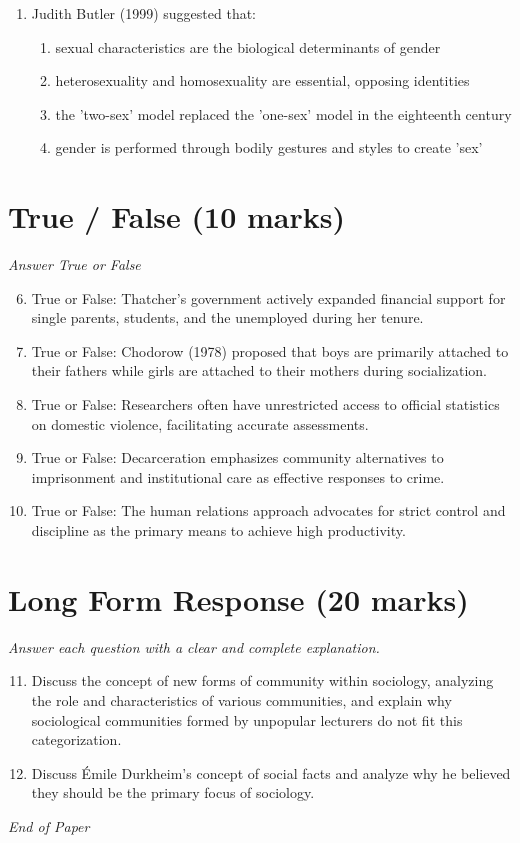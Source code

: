 \documentclass[12pt]{article}
\begin{document}
\begin{enumerate}[label=\arabic*.]
\begin{enumerate}[label=(\alph*)]
    \item a universalist system of welfare for all, regardless of income
    \item decommodifying social welfare through state provision
\end{enumerate}
\item Judith Butler (1999) suggested that:
\begin{enumerate}[label=(\alph*)]
    \item sexual characteristics are the biological determinants of gender
    \item heterosexuality and homosexuality are essential, opposing identities
    \item the 'two-sex' model replaced the 'one-sex' model in the eighteenth century
    \item gender is performed through bodily gestures and styles to create 'sex'
\end{enumerate}
\end{enumerate}

\section*{True / False (10 marks)}
\textit{Answer True or False}
\begin{enumerate}[label=\arabic*.]
\setcounter{enumi}{5}
\item True or False: Thatcher's government actively expanded financial support for single parents, students, and the unemployed during her tenure.
\item True or False: Chodorow (1978) proposed that boys are primarily attached to their fathers while girls are attached to their mothers during socialization.
\item True or False: Researchers often have unrestricted access to official statistics on domestic violence, facilitating accurate assessments.
\item True or False: Decarceration emphasizes community alternatives to imprisonment and institutional care as effective responses to crime.
\item True or False: The human relations approach advocates for strict control and discipline as the primary means to achieve high productivity.
\end{enumerate}

\section*{Long Form Response (20 marks)}
\textit{Answer each question with a clear and complete explanation.}
\begin{enumerate}[label=\arabic*.]
\setcounter{enumi}{10}
\item Discuss the concept of new forms of community within sociology, analyzing the role and characteristics of various communities, and explain why sociological communities formed by unpopular lecturers do not fit this categorization.
\item Discuss Émile Durkheim's concept of social facts and analyze why he believed they should be the primary focus of sociology.
\end{enumerate}

\vfill
\noindent\textit{End of Paper}
\end{document}
